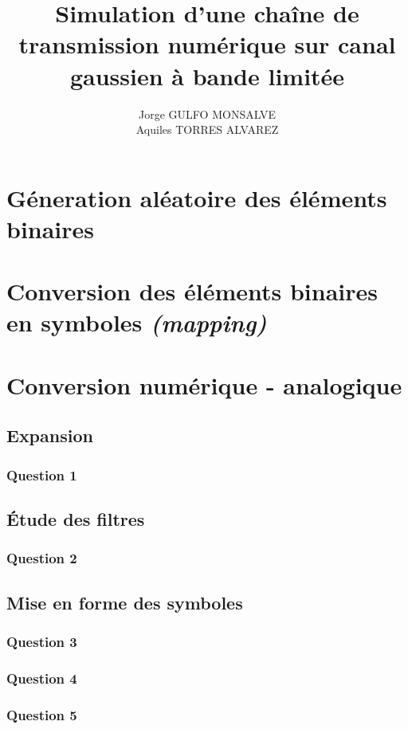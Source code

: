 \documentclass[a4paper,11pt]{article}
\title{Simulation d'une chaîne de transmission numérique sur canal gaussien à bande limitée\newline [Rapport]}
\author{Jorge GULFO MONSALVE\\Aquiles TORRES ALVAREZ}
\begin{document}
\maketitle

\section{Géneration aléatoire des éléments binaires}



\section{Conversion des éléments binaires en symboles \emph{(mapping)}}

\section{Conversion numérique - analogique}

\subsection{Expansion}

\subsubsection*{Question 1}

\subsection{Étude des filtres}

\subsubsection*{Question 2}

\subsection{Mise en forme des symboles}

\subsubsection*{Question 3}
\subsubsection*{Question 4}
\subsubsection*{Question 5}
\end{document}
